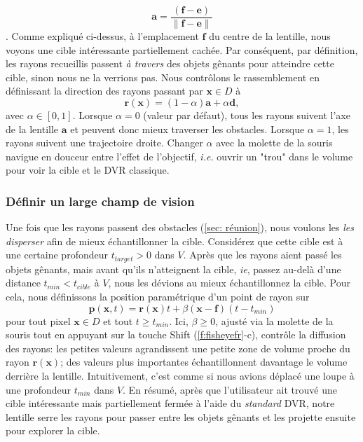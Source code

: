 \begin{equation}
 \mathbf{a} = \frac{(\mathbf{f} - \mathbf{e})}{\| \mathbf{f} - \mathbf{e} \| }
 \end{equation}
 . Comme expliqué ci-dessus, à l'emplacement $ \mathbf{f} $ du centre de la lentille, nous voyons une cible intéressante partiellement cachée. Par conséquent, par définition, les rayons recueillis passent \emph{à travers} des objets gênants pour atteindre cette cible, sinon nous ne la verrions pas. Nous contrôlons le rassemblement en définissant la direction des rayons passant par $ \mathbf{x} \in D $ à
%
\begin{equation}
\mathbf{r}(\mathbf{x}) = (1- \alpha) \mathbf{a} + \alpha \mathbf{d},
\label{eqn:collecte}
\end{equation}
%
avec $ \alpha \in [0,1] $. Lorsque $\alpha = 0 $ (valeur par défaut), tous les rayons suivent l'axe de la lentille $ \mathbf{a} $ et peuvent donc mieux traverser les obstacles. Lorsque $ \alpha = 1 $, les rayons suivent une trajectoire droite. Changer $ \alpha $ avec la molette de la souris navigue en douceur entre l'effet de l'objectif, \emph{i.e.} ouvrir un "trou" dans le volume pour voir la cible et le DVR classique.

\subsubsection{Définir un large champ de vision}
Une fois que les rayons passent des obstacles (\autoref{sec: réunion}), nous voulons les \emph{les disperser} afin de mieux échantillonner la cible. Considérez que cette cible est à une certaine profondeur $ t_{target}> 0 $ dans $ V $. Après que les rayons aient passé les objets gênants, mais avant qu'ils n'atteignent la cible, \emph{ie}, passez au-delà d'une distance $ t_{min} <t_ {cible} $ à $ V $, nous les dévions au mieux échantillonnez la cible. Pour cela, nous définissons la position paramétrique d’un point de rayon sur
%
\begin{equation}
\mathbf{p}(\mathbf{x}, t) = \mathbf{r}(\mathbf{x})t + \beta (\mathbf{x} - \mathbf{f}) (t-t_{min})
\label{eqn:diffusionfr}
\end{equation}
%
pour tout pixel $ \mathbf{x} \in D $ et tout $ t \geq t_{min} $. Ici, $ \beta \geq 0 $, ajusté via la molette de la souris tout en appuyant sur la touche Shift (\autoref{f:fisheyefr}-c), contrôle la diffusion des rayons: les petites valeurs agrandissent une petite zone de volume proche du rayon $\mathbf{r}(\mathbf{x}) $; des valeurs plus importantes échantillonnent davantage le volume derrière la lentille. Intuitivement, c'est comme si nous avions déplacé une loupe à une profondeur $ t_{min} $ dans $ V $. En résumé, après que l'utilisateur ait trouvé une cible intéressante mais partiellement fermée à l'aide du \emph{standard} DVR, notre lentille serre les rayons pour passer entre les objets gênants et les projette ensuite pour explorer la cible.

